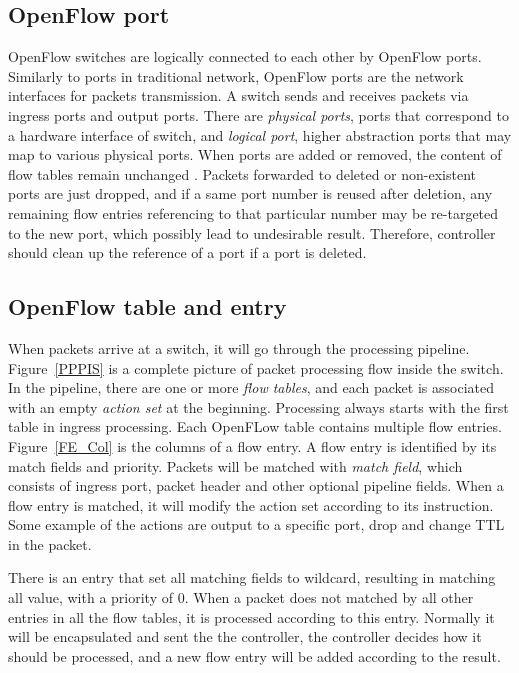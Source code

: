 \subsection{OpenFlow port}
\label{OpenFlow port}
OpenFlow switches are logically connected to each other by OpenFlow ports. Similarly to ports in traditional network, OpenFlow ports are the network interfaces for packets transmission. A switch sends and receives packets via ingress ports and output ports. There are \textit{physical ports}, ports that correspond to a hardware interface of switch, and \textit{logical port}, higher abstraction ports that may map to various physical ports. When ports are added or removed, the content of flow tables remain unchanged
. Packets forwarded to deleted or non-existent ports are just dropped, and if a same port number is reused after deletion, any remaining flow entries referencing to that particular number may be re-targeted to the new port, which possibly lead to undesirable result. Therefore, controller should clean up the reference of a port if a port is deleted. \cite{OF_SPEC}

\subsection{OpenFlow table and entry}
\label{OpenFlow table and entry}
When packets arrive at a switch, it will go through the processing pipeline. Figure~\ref{PPPIS} is a complete picture of packet processing flow inside the switch. In the pipeline, there are one or more \textit{flow tables}, and each packet is associated with an empty \textit{action set} at the beginning. Processing always starts with the first table in ingress processing. Each OpenFLow table contains multiple flow entries. Figure~\ref{FE_Col} is the columns of a flow entry. A flow entry is identified by its match fields and priority. Packets will be matched with \textit{match field}, which consists of ingress port, packet header and other optional pipeline fields. When a flow entry is matched, it will modify the action set according to its instruction. Some example of the actions are output to a specific port, drop and change TTL in the packet.

There is an entry that set all matching fields to wildcard, resulting in matching all value, with a priority of 0. When a packet does not matched by all other entries in all the flow tables, it is processed according to this entry. Normally it will be encapsulated and sent the the controller, the controller decides how it should be processed, and a new flow entry will be added according to the result.

